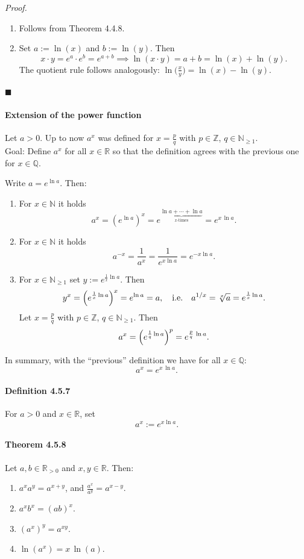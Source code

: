 \documentclass[12pt]{article}
\begin{document}
	\emph{Proof.}
	\begin{enumerate}[label=({\arabic*})]
		\item Follows from Theorem 4.4.8.
		\item Set $a := \ln(x)$ and $b := \ln(y)$. Then
		\[
			x\cdot y = e^{a} \cdot e^{b} = e^{a+b} \implies \ln(x\cdot y) = a+b = \ln(x) + \ln(y).
		\]
		The quotient rule follows analogously: $\ln\bigl(\tfrac{x}{y}\bigr) = \ln(x) - \ln(y)$.
	\end{enumerate}
	\hfill $\blacksquare$

	\paragraph{Extension of the power function}
	Let $a>0$. Up to now $a^{x}$ was defined for $x = \tfrac{p}{q}$ with $p\in\mathbb Z$, $q\in\mathbb N_{\ge 1}$.\\
	Goal: Define $a^{x}$ for all $x\in\mathbb R$ so that the definition agrees with the previous one for $x\in\mathbb Q$.

	Write $a = e^{\ln a}$. Then:
	\begin{enumerate}[label=({\arabic*})]
		\item For $x\in\mathbb N$ it holds
		\[
			a^{x} = (e^{\ln a})^{x} = e^{\underbrace{\ln a + \cdots + \ln a}_{x\text{-times}}} = e^{x\,\ln a}.
		\]
		\item For $x\in\mathbb N$ it holds
		\[
			a^{-x} = \frac{1}{a^{x}} = \frac{1}{e^{x\ln a}} = e^{-x\ln a}.
		\]
		\item For $x\in\mathbb N_{\ge 1}$ set $y := e^{\frac{1}{x}\ln a}$. Then
		\[
			y^{x} = \Bigl(e^{\frac{1}{x}\ln a}\Bigr)^{x} = e^{\ln a} = a,\quad\text{i.e.}\quad a^{1/x} = \sqrt[x]{a} = e^{\frac{1}{x}\ln a}.
		\]
		Let $x = \tfrac{p}{q}$ with $p\in\mathbb Z$, $q\in\mathbb N_{\ge 1}$. Then
		\[
			a^{x} = \Bigl(e^{\frac{1}{q}\ln a}\Bigr)^{p} = e^{\frac{p}{q}\,\ln a}.
		\]
	\end{enumerate}
	In summary, with the “previous” definition we have for all $x\in\mathbb Q$:
	\[
		a^{x} = e^{x\,\ln a}.
	\]

	\paragraph{Definition 4.5.7} For $a>0$ and $x\in\mathbb R$, set
	\[
		a^{x} := e^{x\ln a}.
	\]

	\paragraph{Theorem 4.5.8} Let $a,b\in\mathbb R_{>0}$ and $x,y\in\mathbb R$. Then:
	\begin{enumerate}[label=({\arabic*})]
		\item $a^{x} a^{y} = a^{x+y}$, and $\displaystyle \frac{a^{x}}{a^{y}} = a^{x-y}$.
		\item $a^{x} b^{x} = (ab)^{x}$.
		\item $(a^{x})^{y} = a^{xy}$.
		\item $\ln(a^{x}) = x\,\ln(a)$.
	\end{enumerate}
\end{document}
